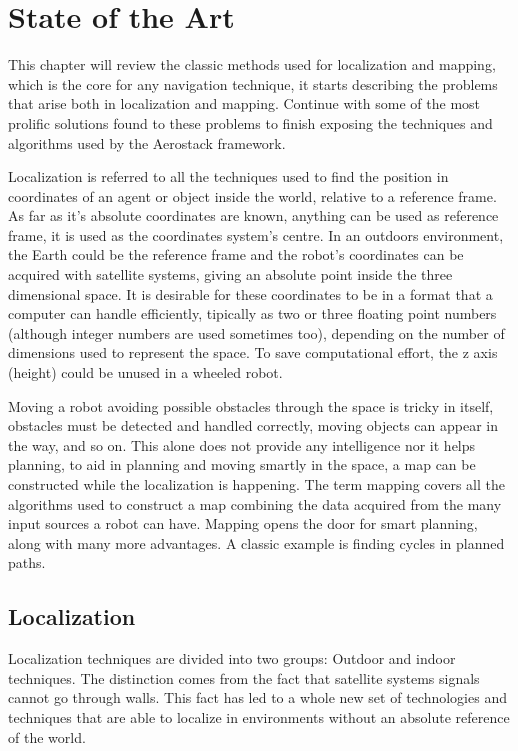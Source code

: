 \chapter{State of the Art}

  This chapter will review the classic methods used for localization and mapping, which is the core for any navigation technique, it starts describing the problems that arise both in localization and mapping. Continue with some of the most prolific solutions found to these problems to finish exposing the techniques and algorithms used by the Aerostack framework.

  Localization is referred to all the techniques used to find the position in coordinates of an agent or object inside the world, relative to a reference frame. As far as it's absolute coordinates are known, anything can be used as reference frame, it is used as the coordinates system's centre. In an outdoors environment, the Earth could be the reference frame and the robot's coordinates can be acquired with satellite systems, giving an absolute point inside the three dimensional space. It is desirable for these coordinates to be in a format that a computer can handle efficiently, tipically as two or three floating point numbers (although integer numbers are used sometimes too), depending on the number of dimensions used to represent the space. To save computational effort, the z axis (height) could be unused in a wheeled robot.

  Moving a robot avoiding possible obstacles through the space is tricky in itself, obstacles must be detected and handled correctly, moving objects can appear in the way, and so on. This alone does not provide any intelligence nor it helps planning, to aid in planning and moving smartly in the space, a map can be constructed while the localization is happening. The term mapping covers all the algorithms used to construct a map combining the data acquired from the many input sources a robot can have. Mapping opens the door for smart planning, along with many more advantages. A classic example is finding cycles in planned paths.

  \clearpage

  \section{Localization}

    Localization techniques are divided into two groups: Outdoor and indoor techniques. The distinction comes from the fact that satellite systems signals cannot go through walls. This fact has led to a whole new set of technologies and techniques that are able to localize in environments without an absolute reference of the world.

